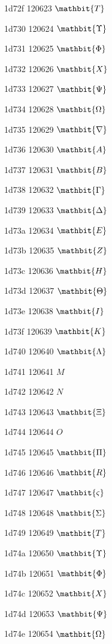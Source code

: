 \documentclass[11pt]{article}
\begin{document}
1d72f 120623 \ensuremath{\mathbit{{T}}}

1d730 120624 \ensuremath{\mathbit{\Upsilon}}

1d731 120625 \ensuremath{\mathbit{\Phi}}

1d732 120626 \ensuremath{\mathbit{{X}}}

1d733 120627 \ensuremath{\mathbit{\Psi}}

1d734 120628 \ensuremath{\mathbit{\Omega}}

1d735 120629 \ensuremath{\mathbit{\nabla}}

1d736 120630 \ensuremath{\mathbit{{A}}}

1d737 120631 \ensuremath{\mathbit{{B}}}

1d738 120632 \ensuremath{\mathbit{\Gamma}}

1d739 120633 \ensuremath{\mathbit{\Delta}}

1d73a 120634 \ensuremath{\mathbit{{E}}}

1d73b 120635 \ensuremath{\mathbit{{Z}}}

1d73c 120636 \ensuremath{\mathbit{{H}}}

1d73d 120637 \ensuremath{\mathbit{\Theta}}

1d73e 120638 \ensuremath{\mathbit{{I}}}

1d73f 120639 \ensuremath{\mathbit{{K}}}

1d740 120640 \ensuremath{\mathbit{\Lambda}}

1d741 120641 \ensuremath{M}

1d742 120642 \ensuremath{N}

1d743 120643 \ensuremath{\mathbit{\Xi}}

1d744 120644 \ensuremath{O}

1d745 120645 \ensuremath{\mathbit{\Pi}}

1d746 120646 \ensuremath{\mathbit{{R}}}

1d747 120647 \ensuremath{\mathbit{\varsigma}}

1d748 120648 \ensuremath{\mathbit{\Sigma}}

1d749 120649 \ensuremath{\mathbit{{T}}}

1d74a 120650 \ensuremath{\mathbit{\Upsilon}}

1d74b 120651 \ensuremath{\mathbit{\Phi}}

1d74c 120652 \ensuremath{\mathbit{{X}}}

1d74d 120653 \ensuremath{\mathbit{\Psi}}

1d74e 120654 \ensuremath{\mathbit{\Omega}}
\end{document}
